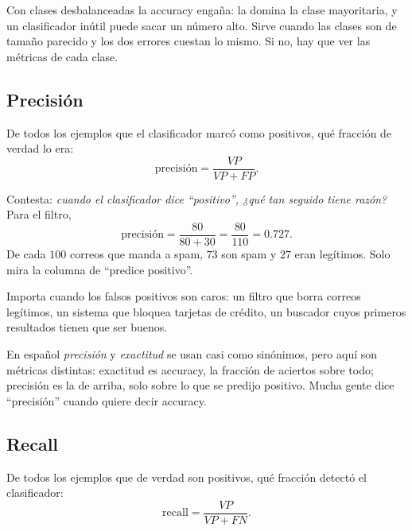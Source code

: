 \documentclass[11pt,letterpaper]{article}
\begin{document}
\begin{ojo}
    Con clases desbalanceadas la accuracy engaña: la domina la clase
    mayoritaria, y un clasificador inútil puede sacar un número alto.
    Sirve cuando las clases son de tamaño parecido y los dos errores
    cuestan lo mismo. Si no, hay que ver las métricas de cada clase.
\end{ojo}


\subsection*{Precisión}

\begin{definicion}[Precisión]
    De todos los ejemplos que el clasificador marcó como positivos,
    qué fracción de verdad lo era:
    \[
        \text{precisión} = \frac{VP}{VP + FP} .
    \]
\end{definicion}

Contesta: \textit{cuando el clasificador dice ``positivo'', ¿qué tan
seguido tiene razón?} Para el filtro,
\[
    \text{precisión} = \frac{80}{80 + 30} = \frac{80}{110} = 0.727 .
\]
De cada $100$ correos que manda a spam, $73$ son spam y $27$ eran
legítimos. Solo mira la columna de ``predice positivo''.

Importa cuando los falsos positivos son caros: un filtro que borra
correos legítimos, un sistema que bloquea tarjetas de crédito, un
buscador cuyos primeros resultados tienen que ser buenos.

\begin{ojo}
    En español \textit{precisión} y \textit{exactitud} se usan casi
    como sinónimos, pero aquí son métricas distintas: exactitud es
    accuracy, la fracción de aciertos sobre todo; precisión es la de
    arriba, solo sobre lo que se predijo positivo. Mucha gente dice
    ``precisión'' cuando quiere decir accuracy.
\end{ojo}


\subsection*{Recall}

\begin{definicion}[Recall]
    De todos los ejemplos que de verdad son positivos, qué fracción
    detectó el clasificador:
    \[
        \text{recall} = \frac{VP}{VP + FN} .
    \]
\end{definicion}
\end{document}
